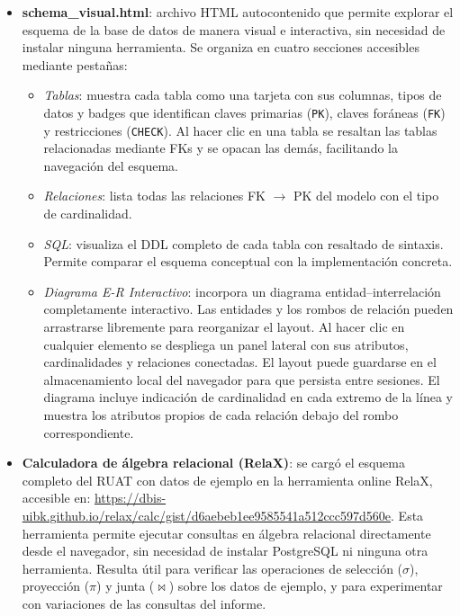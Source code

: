 \documentclass[12pt,a4paper]{article}
\begin{document}
\begin{itemize}[leftmargin=*]
    \item \textbf{schema\_visual.html}: archivo HTML autocontenido que permite explorar el esquema de la base de datos de manera visual e interactiva, sin necesidad de instalar ninguna herramienta. Se organiza en cuatro secciones accesibles mediante pestañas:
    \begin{itemize}
        \item \emph{Tablas}: muestra cada tabla como una tarjeta con sus columnas, tipos de datos y badges que identifican claves primarias (\texttt{PK}), claves foráneas (\texttt{FK}) y restricciones (\texttt{CHECK}). Al hacer clic en una tabla se resaltan las tablas relacionadas mediante FKs y se opacan las demás, facilitando la navegación del esquema.
        \item \emph{Relaciones}: lista todas las relaciones FK $\rightarrow$ PK del modelo con el tipo de cardinalidad.
        \item \emph{SQL}: visualiza el DDL completo de cada tabla con resaltado de sintaxis. Permite comparar el esquema conceptual con la implementación concreta.
        \item \emph{Diagrama E-R Interactivo}: incorpora un diagrama entidad--interrelación completamente interactivo. Las entidades y los rombos de relación pueden arrastrarse libremente para reorganizar el layout. Al hacer clic en cualquier elemento se despliega un panel lateral con sus atributos, cardinalidades y relaciones conectadas. El layout puede guardarse en el almacenamiento local del navegador para que persista entre sesiones. El diagrama incluye indicación de cardinalidad en cada extremo de la línea y muestra los atributos propios de cada relación debajo del rombo correspondiente.
    \end{itemize}

    \item \textbf{Calculadora de álgebra relacional (RelaX)}: se cargó el esquema completo del RUAT con datos de ejemplo en la herramienta online RelaX, accesible en: \url{https://dbis-uibk.github.io/relax/calc/gist/d6aebeb1ee9585541a512ccc597d560e}. Esta herramienta permite ejecutar consultas en álgebra relacional directamente desde el navegador, sin necesidad de instalar PostgreSQL ni ninguna otra herramienta. Resulta útil para verificar las operaciones de selección ($\sigma$), proyección ($\pi$) y junta ($\bowtie$) sobre los datos de ejemplo, y para experimentar con variaciones de las consultas del informe.
\end{itemize}
\end{document}

